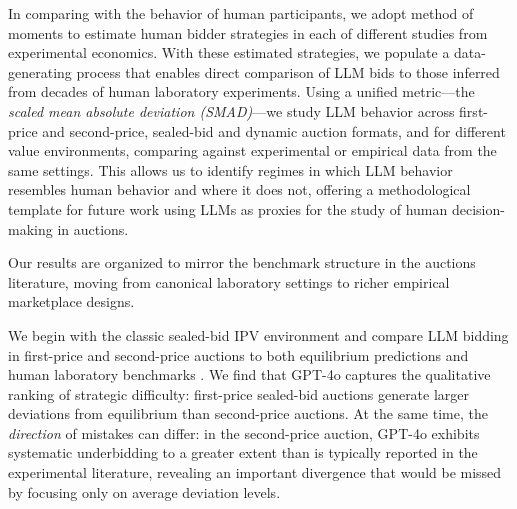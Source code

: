 

In comparing with the behavior of human participants, we adopt method of moments to estimate human bidder strategies in each of different studies from experimental economics. With these estimated strategies, we populate a data-generating process that enables direct comparison of LLM bids to those inferred from decades of human laboratory experiments. Using a unified metric---the {\em scaled mean absolute deviation (SMAD)}---we study LLM behavior across first-price and second-price, sealed-bid and dynamic auction formats, and for different value environments, comparing  against experimental or empirical data from the same settings. This allows us to identify regimes in which LLM behavior resembles human behavior and where it does not, offering a methodological template for future work using LLMs as proxies for the study of human decision-making in auctions.

Our results are organized to mirror the benchmark structure in the auctions literature, moving from canonical laboratory settings to richer empirical marketplace designs.

We begin with the classic sealed-bid IPV environment and compare LLM bidding in first-price and second-price auctions to both equilibrium predictions and human laboratory benchmarks \citep{kagel1993independent, kagel2020handbook}. We find that GPT-4o captures the qualitative ranking of strategic difficulty: first-price sealed-bid auctions generate larger deviations from equilibrium than second-price auctions. At the same time, the \emph{direction} of mistakes can differ: in the second-price auction, GPT-4o exhibits systematic underbidding to a greater extent than is typically reported in the experimental literature, revealing an important divergence that would be missed by focusing only on average deviation levels.

